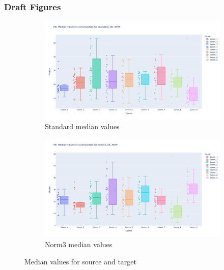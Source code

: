 \subsubsection{Draft Figures}

\begin{figure}[H]
    \captionsetup[subfigure]{justification=Centering}
    \begin{subfigure}[t]{0.5\textwidth}
        \includegraphics[width=\textwidth]{Images/P0/standard_4K_50TF_median.png}
        \caption{Standard median values}
    \end{subfigure}\hspace{\fill} %
    \bigskip %
    \begin{subfigure}[t]{0.5\textwidth}
        \includegraphics[width=\linewidth]{Images/P0/norm3_4K_50TF_median.png}
        \caption{Norm3 median values}
    \end{subfigure}\hspace{\fill} %
    \caption{Median values for source and target}
    \label{fig:N_I:P0_median}
\end{figure}


